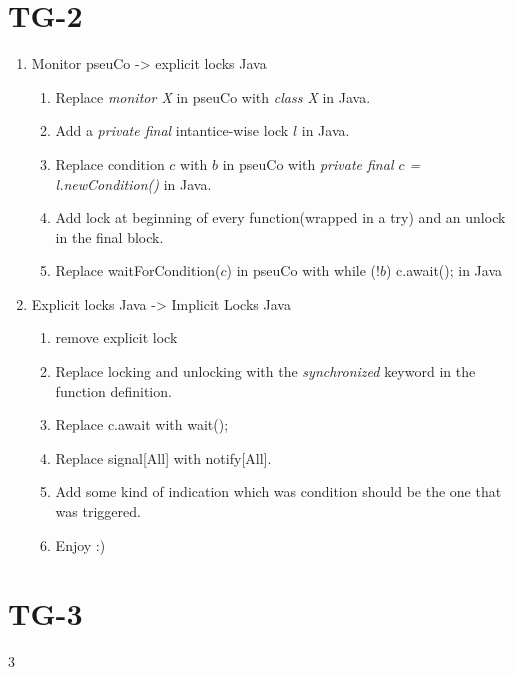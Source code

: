 \documentclass[12pt]{article}
\begin{document}
    \section{TG-2}
    \begin{enumerate}
        \item Monitor pseuCo -> explicit locks Java
        \begin{enumerate}[label=(\alph*)]
            \item Replace \textit{monitor X} in pseuCo with \textit{class X} in Java.
            \item Add a \textit{private final}  intantice-wise lock $l$ in Java.
            \item Replace condition $c$ with $b$ in pseuCo with \textit{private final $c$ = l.newCondition()} in Java.
            \item Add lock at beginning of every function(wrapped in a try) and an unlock in the final block.
            \item Replace waitForCondition($c$) in pseuCo with while ($!b$) c.await(); in Java
        \end{enumerate}
        \item Explicit locks Java -> Implicit Locks Java
        \begin{enumerate}[label=(\alph*)]
            \item remove explicit lock
            \item Replace locking and unlocking with the \textit{synchronized} keyword in the function definition.
            \item Replace c.await with wait();
            \item Replace signal[All] with notify[All].
            \item Add some kind of indication which was condition should be the one that was triggered.
            \item Enjoy :)
        \end{enumerate}
    \end{enumerate}

    \section{TG-3}3
\end{document}
